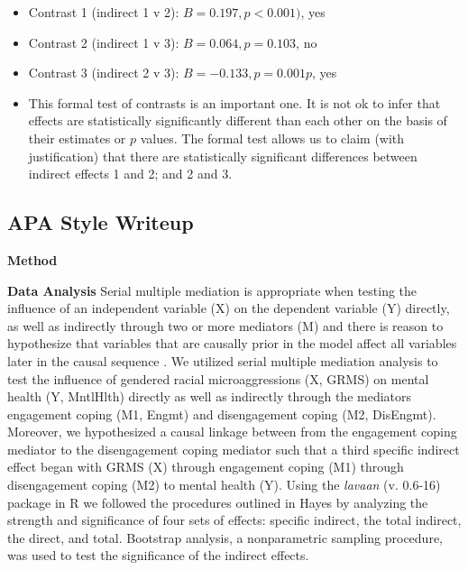 \documentclass[
  11pt,
]{book}
\providecommand{\tightlist}{%
  \setlength{\itemsep}{0pt}\setlength{\parskip}{0pt}}
\begin{document}
\begin{itemize}
  \begin{itemize}
  \tightlist
  \item
    Contrast 1 (indirect 1 v 2): \(B = 0.197, p <0.001)\), yes
  \item
    Contrast 2 (indirect 1 v 3): \(B = 0.064, p = 0.103\), no
  \item
    Contrast 3 (indirect 2 v 3): \(B = -0.133,p = 0.001p\), yes
  \item
    This formal test of contrasts is an important one. It is not ok to infer that effects are statistically significantly different than each other on the basis of their estimates or \(p\) values. The formal test allows us to claim (with justification) that there are statistically significant differences between indirect effects 1 and 2; and 2 and 3.
  \end{itemize}
\end{itemize}

\hypertarget{apa-style-writeup-2}{%
\subsection{APA Style Writeup}\label{apa-style-writeup-2}}

\textbf{Method}

\textbf{Data Analysis} Serial multiple mediation is appropriate when testing the influence of an independent variable (X) on the dependent variable (Y) directly, as well as indirectly through two or more mediators (M) and there is reason to hypothesize that variables that are causally prior in the model affect all variables later in the causal sequence \citep{hayes_more_2022}. We utilized serial multiple mediation analysis to test the influence of gendered racial microaggressions (X, GRMS) on mental health (Y, MntlHlth) directly as well as indirectly through the mediators engagement coping (M1, Engmt) and disengagement coping (M2, DisEngmt). Moreover, we hypothesized a causal linkage between from the engagement coping mediator to the disengagement coping mediator such that a third specific indirect effect began with GRMS (X) through engagement coping (M1) through disengagement coping (M2) to mental health (Y). Using the \emph{lavaan} (v. 0.6-16) package in R we followed the procedures outlined in Hayes \citeyearpar{hayes_more_2022} by analyzing the strength and significance of four sets of effects: specific indirect, the total indirect, the direct, and total. Bootstrap analysis, a nonparametric sampling procedure, was used to test the significance of the indirect effects.
\end{document}
